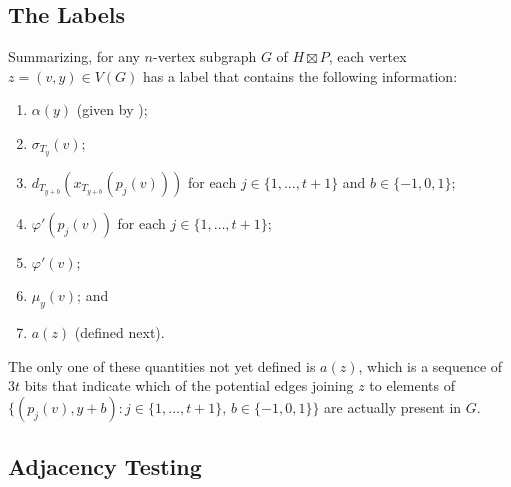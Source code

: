 \documentclass[kpfonts]{patmorin}
\newcommand{\snote}[1]{\fcolorbox{red}{yellow}{#1}}
\begin{document}
\subsection{The Labels}

Summarizing, for any $n$-vertex subgraph $G$ of $H\boxtimes P$, each vertex $z=(v,y)\in V(G)$ has a label that contains the following information:

\begin{enumerate}
  \item $\alpha(y)$ (given by );%
  \item $\sigma_{T_y}(v)$; %
  \item $d_{T_{y+b}}(x_{T_{y+b}}(p_j(v)))$ for each $j\in\{1,\ldots,t+1\}$ and $b\in\{-1,0,1\}$;
  \item $\varphi'(p_j(v))$ for each $j\in\{1,\ldots,t+1\}$;
  \item $\varphi'(v)$;
  \item $\mu_y(v)$; and
  \item $a(z)$ (defined next).
\end{enumerate}
The only one of these quantities not yet defined is $a(z)$, which is a sequence of $3t$ bits that indicate which of the potential edges joining $z$ to elements of $\{(p_j(v),y+b): j\in\{1,\ldots,t+1\},\, b\in\{-1,0,1\}\}$ are actually present in $G$.

\subsection{Adjacency Testing}
\end{document}
